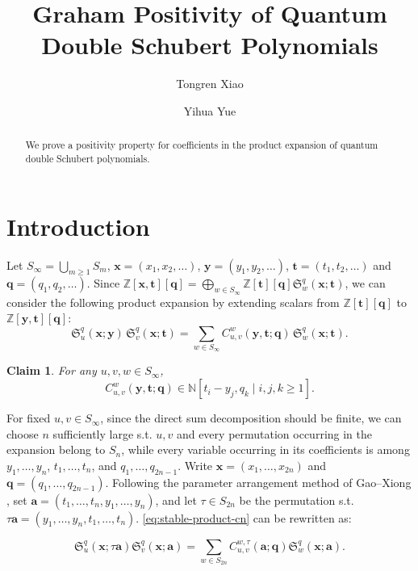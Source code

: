 \documentclass[12pt]{amsart}
\title[Graham Positivity of Quantum Double Schubert Polynomials]{Graham Positivity of Quantum Double Schubert Polynomials}
\author{Tongren Xiao}
\author{Yihua Yue}
\date{}
\newtheorem*{claim}{Claim}
\theoremstyle{definition}
\theoremstyle{remark}
\newcommand{\bN}{\mathbb{N}}
\begin{document}
\begin{abstract}
We prove a positivity property for coefficients in the product expansion of quantum double Schubert polynomials. 
\end{abstract}

\maketitle

\section{Introduction}

Let \(S_\infty=\bigcup_{m\ge1}S_m\),
\(\mathbf{x}=(x_1,x_2,\ldots)\),
\(\mathbf{y}=(y_1,y_2,\ldots)\),
\(\mathbf{t}=(t_1,t_2,\ldots)\) and 
\(\mathbf{q}=(q_1,q_2,\ldots)\).
Since \(\mathbb{Z}[\mathbf{x},\mathbf{t}][\mathbf{q}]=\bigoplus_{w\in S_\infty}\mathbb{Z}[\mathbf{t}][\mathbf{q}]\mathfrak{S}_w^q(\mathbf{x};\mathbf{t})\), we can consider the
following product expansion by extending scalars from
\(\mathbb{Z}[\mathbf{t}][\mathbf{q}]\) to
\(\mathbb{Z}[\mathbf{y},\mathbf{t}][\mathbf{q}]\):
\begin{equation}\label{eq:stable-product-cn}
\mathfrak{S}_u^q(\mathbf{x};\mathbf{y})\,
\mathfrak{S}_v^q(\mathbf{x};\mathbf{t})
=
\sum_{w\in S_\infty}
C_{u,v}^{w}(\mathbf{y},\mathbf{t};\mathbf{q})\,
\mathfrak{S}_w^q(\mathbf{x};\mathbf{t}).
\end{equation}

\begin{claim}\label{claim:main-cn}
For any \(u,v,w\in S_\infty\),
\[
C_{u,v}^{w}(\mathbf{y},\mathbf{t};\mathbf{q})
\in
\bN[t_i-y_j,q_k\mid i,j,k\ge1].
\]
\end{claim}

For fixed
\(u,v\in S_\infty\), since the direct sum decomposition should be finite, 
we can choose \(n\) sufficiently large s.t. \(u,v\)
and every permutation occurring in the expansion belong to \(S_n\),
while every variable occurring in its coefficients is among
\(y_1,\ldots,y_n\), \(t_1,\ldots,t_n\), and
\(q_1,\ldots,q_{2n-1}\). Write \(\mathbf{x}=(x_1,\ldots,x_{2n})\) and
\(\mathbf{q}=(q_1,\ldots,q_{2n-1})\). Following the parameter
arrangement method of Gao--Xiong \cite{GX}, set
\(\mathbf a=(t_1,\ldots,t_n,y_1,\ldots,y_n)\), and let
\(\tau\in S_{2n}\) be the permutation s.t. $\tau\mathbf a=(y_1,\ldots,y_n,t_1,\ldots,t_n)$. \eqref{eq:stable-product-cn} can be rewritten as:

\begin{equation}\label{eq:stable-product-new}
  \mathfrak S_u^q(\mathbf x;\tau\mathbf a)\mathfrak S_v^q(\mathbf x;\mathbf a)=
  \sum_{w\in S_{2n}}
  C_{u,v}^{w,\tau}(\mathbf a;\mathbf q)\mathfrak S_w^q(\mathbf x;\mathbf a). 
\end{equation}
\end{document}
